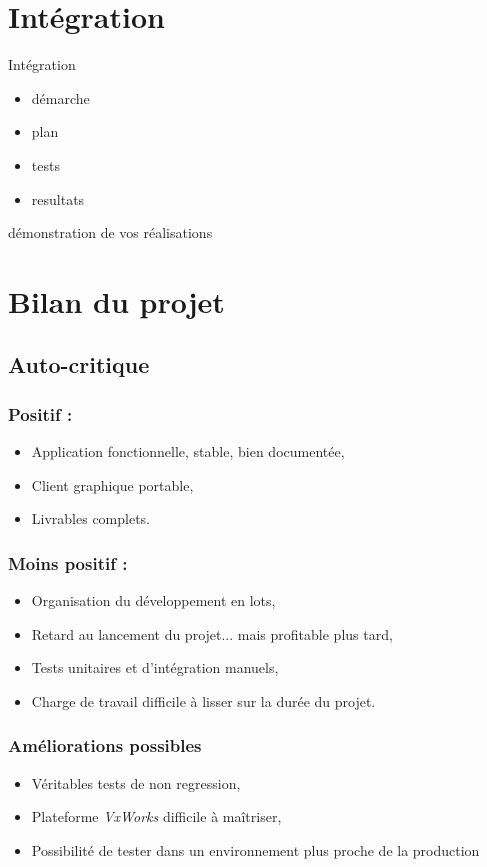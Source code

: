 \documentclass{beamer}
\begin{document}
\section{Intégration}
	\begin{frame}
		Intégration
		\begin{itemize}
			\item démarche
			\item plan
			\item tests
			\item resultats
		\end{itemize}
	\end{frame}

	\begin{frame}
		démonstration de vos réalisations
	\end{frame}

\section{Bilan du projet}
	\subsection{Auto-critique}
	\begin{frame}
	\frametitle{Positif :}
	\begin{itemize}
		\item Application fonctionnelle, stable, bien documentée,
		\item Client graphique portable,
		\item Livrables complets.
	\end{itemize}
	\end{frame}

	\begin{frame}
	\frametitle{Moins positif :}
	\begin{itemize}
		\item Organisation du développement en lots,
		\item Retard au lancement du projet... mais profitable plus tard,
		\item Tests unitaires et d'intégration manuels,
		\item Charge de travail difficile à lisser sur la durée du projet.
	\end{itemize}
	\end{frame}

	\begin{frame}
	\frametitle{Améliorations possibles}
	\begin{itemize}
		\item Véritables tests de non regression,
		\item Plateforme \textit{VxWorks} difficile à maîtriser,
		\item Possibilité de tester dans un environnement plus proche de la
production
	\end{itemize}
	\end{frame}
\end{document}
